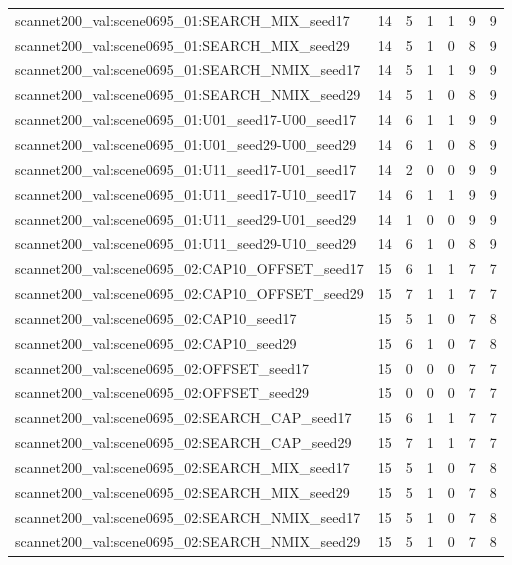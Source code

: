 \begin{table}[t]
\begin{tabular}{lrrrrrr}
scannet200\_val:scene0695\_01:SEARCH\_MIX\_seed17 & 14 & 5 & 1 & 1 & 9 & 9 \\
scannet200\_val:scene0695\_01:SEARCH\_MIX\_seed29 & 14 & 5 & 1 & 0 & 8 & 9 \\
scannet200\_val:scene0695\_01:SEARCH\_NMIX\_seed17 & 14 & 5 & 1 & 1 & 9 & 9 \\
scannet200\_val:scene0695\_01:SEARCH\_NMIX\_seed29 & 14 & 5 & 1 & 0 & 8 & 9 \\
scannet200\_val:scene0695\_01:U01\_seed17-U00\_seed17 & 14 & 6 & 1 & 1 & 9 & 9 \\
scannet200\_val:scene0695\_01:U01\_seed29-U00\_seed29 & 14 & 6 & 1 & 0 & 8 & 9 \\
scannet200\_val:scene0695\_01:U11\_seed17-U01\_seed17 & 14 & 2 & 0 & 0 & 9 & 9 \\
scannet200\_val:scene0695\_01:U11\_seed17-U10\_seed17 & 14 & 6 & 1 & 1 & 9 & 9 \\
scannet200\_val:scene0695\_01:U11\_seed29-U01\_seed29 & 14 & 1 & 0 & 0 & 9 & 9 \\
scannet200\_val:scene0695\_01:U11\_seed29-U10\_seed29 & 14 & 6 & 1 & 0 & 8 & 9 \\
scannet200\_val:scene0695\_02:CAP10\_OFFSET\_seed17 & 15 & 6 & 1 & 1 & 7 & 7 \\
scannet200\_val:scene0695\_02:CAP10\_OFFSET\_seed29 & 15 & 7 & 1 & 1 & 7 & 7 \\
scannet200\_val:scene0695\_02:CAP10\_seed17 & 15 & 5 & 1 & 0 & 7 & 8 \\
scannet200\_val:scene0695\_02:CAP10\_seed29 & 15 & 6 & 1 & 0 & 7 & 8 \\
scannet200\_val:scene0695\_02:OFFSET\_seed17 & 15 & 0 & 0 & 0 & 7 & 7 \\
scannet200\_val:scene0695\_02:OFFSET\_seed29 & 15 & 0 & 0 & 0 & 7 & 7 \\
scannet200\_val:scene0695\_02:SEARCH\_CAP\_seed17 & 15 & 6 & 1 & 1 & 7 & 7 \\
scannet200\_val:scene0695\_02:SEARCH\_CAP\_seed29 & 15 & 7 & 1 & 1 & 7 & 7 \\
scannet200\_val:scene0695\_02:SEARCH\_MIX\_seed17 & 15 & 5 & 1 & 0 & 7 & 8 \\
scannet200\_val:scene0695\_02:SEARCH\_MIX\_seed29 & 15 & 5 & 1 & 0 & 7 & 8 \\
scannet200\_val:scene0695\_02:SEARCH\_NMIX\_seed17 & 15 & 5 & 1 & 0 & 7 & 8 \\
scannet200\_val:scene0695\_02:SEARCH\_NMIX\_seed29 & 15 & 5 & 1 & 0 & 7 & 8 \\

\end{tabular}
\end{table}
